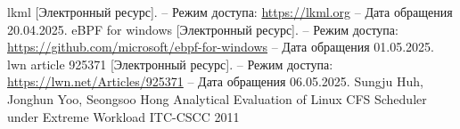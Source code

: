 \documentclass[12pt, oneside]{book}
\begin{document}
\begin{thebibliography}{9}
  lkml [Электронный ресурс]. -- Режим доступа: \url{https://lkml.org}
  -- Дата обращения 20.04.2025.
  eBPF for windows [Электронный ресурс]. -- Режим доступа: 
  \url{https://github.com/microsoft/ebpf-for-windows}
  -- Дата обращения 01.05.2025.
  lwn article 925371 [Электронный ресурс]. -- Режим доступа:
  \url{https://lwn.net/Articles/925371}
  -- Дата обращения 06.05.2025.
  Sungju Huh, Jonghun Yoo, Seongsoo Hong Analytical Evaluation of Linux
  CFS Scheduler under Extreme Workload ITC-CSCC 2011
\end{thebibliography}
\end{document}
